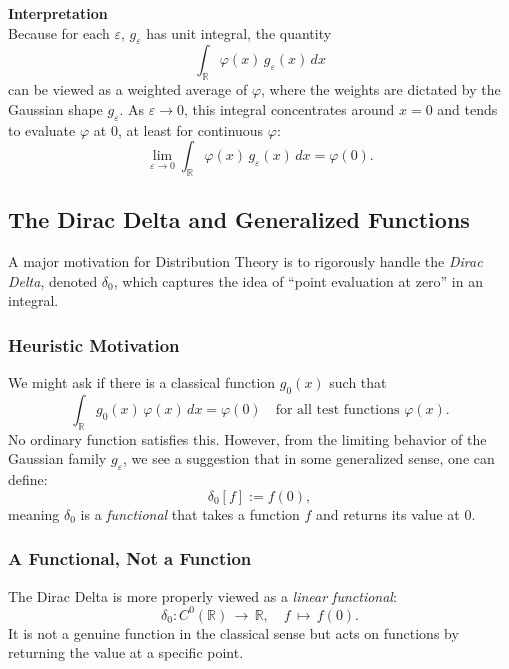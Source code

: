 \documentclass[11pt,openany]{book}
\begin{document}
\noindent \textbf{Interpretation} \\
Because for each $\varepsilon$, \(g_\varepsilon\) has unit integral, the quantity
\[
\int_{\mathbb{R}} \varphi(x)\, g_\varepsilon(x)\, dx
\]
can be viewed as a weighted average of \(\varphi\), where the weights are dictated by the Gaussian shape \(g_\varepsilon\). As \(\varepsilon \to 0\), this integral concentrates around \(x=0\) and tends to evaluate \(\varphi\) at \(0\), at least for continuous \(\varphi\):
\[
\lim_{\varepsilon \to 0} \int_{\mathbb{R}} \varphi(x)\, g_\varepsilon(x)\, dx
= \varphi(0).
\]

\subsection{The Dirac Delta and Generalized Functions}

A major motivation for Distribution Theory is to rigorously handle the \textit{Dirac Delta}, denoted \(\delta_0\), which captures the idea of “point evaluation at zero” in an integral.

\subsubsection{Heuristic Motivation}

We might ask if there is a classical function \(g_0(x)\) such that
\[
\int_{\mathbb{R}} g_0(x)\,\varphi(x)\,dx = \varphi(0)
\quad
\text{for all test functions } \varphi(x).
\]
No ordinary function satisfies this. However, from the limiting behavior of the Gaussian family \(g_\varepsilon\), we see a suggestion that in some generalized sense, one can define:
\[
\delta_0[f] := f(0),
\]
meaning \(\delta_0\) is a \textit{functional} that takes a function \(f\) and returns its value at \(0\).

\subsubsection{A Functional, Not a Function}

The Dirac Delta is more properly viewed as a \textit{linear functional}:
\[
\delta_0 : C^0(\mathbb{R}) \,\to\, \mathbb{R},
\quad
f \,\mapsto\, f(0).
\]
It is not a genuine function in the classical sense but acts on functions by returning the value at a specific point.
\end{document}
